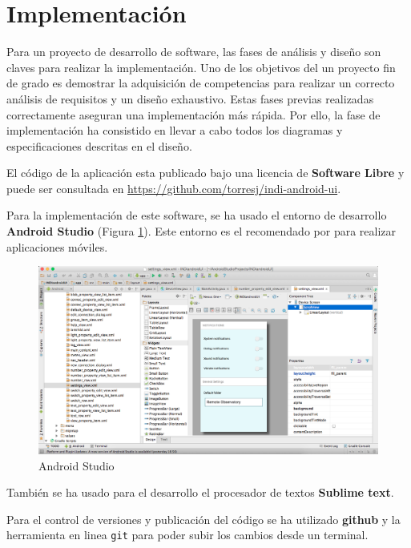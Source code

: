\bigskip
\section{Implementación}

Para un proyecto de desarrollo de software, las fases de análisis y diseño son claves para realizar la implementación. Uno de los objetivos del un proyecto fin de grado es demostrar la adquisición de competencias para realizar un correcto análisis de requisitos y un diseño exhaustivo. Estas fases previas realizadas correctamente aseguran una implementación más rápida. Por ello, la fase de implementación ha consistido en llevar a cabo todos los diagramas y especificaciones descritas en el diseño.

\bigskip
El código de la aplicación esta publicado bajo una licencia de \textbf{Software Libre} y puede ser consultada en \url{https://github.com/torresj/indi-android-ui}.

\bigskip
Para la implementación de este software, se ha usado el entorno de desarrollo \textbf{Android Studio} (Figura \ref{fig:android_studio}). Este entorno es el recomendado por  para realizar aplicaciones móviles.

\begin{figure}[!ht]
  \begin{center}
    \includegraphics[width=1\textwidth]{../images/android_studio.png}
    \caption{Android Studio}
    \label{fig:android_studio}
  \end{center}
\end{figure}

\bigskip
También se ha usado para el desarrollo el procesador de textos \textbf{Sublime text}.

\bigskip
Para el control de versiones y publicación del código se ha utilizado \textbf{github} y la herramienta en linea \texttt{git} para poder subir los cambios desde un terminal.